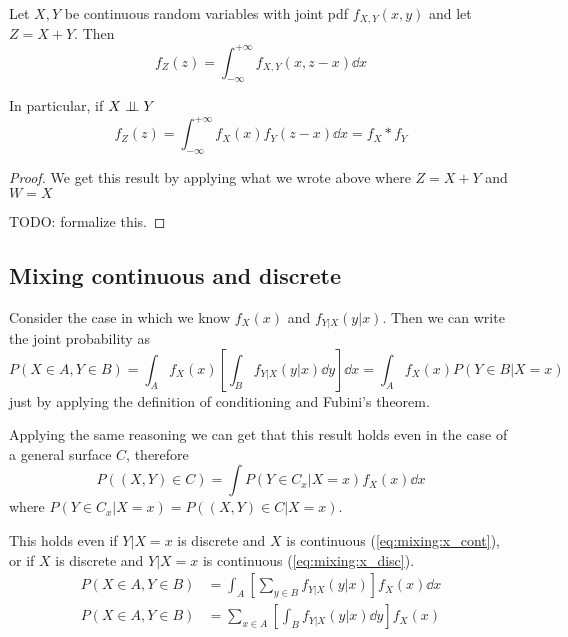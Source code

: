 \documentclass[12pt]{extarticle}
\begin{document}
\begin{theorem}
    Let $X, Y$ be continuous random variables with joint pdf $f_{X, Y}(x, y)$ and let $Z = X + Y$.
    Then
    \begin{equation}
        f_Z(z) = \int_{-\infty}^{+\infty} f_{X, Y} (x, z-x) \dd{x}
    \end{equation}

    In particular, if $X \perp \!\!\! \perp Y$
    \begin{equation}
        f_Z(z) = \int_{-\infty}^{+\infty} f_X(x) f_Y(z-x) \dd{x} = f_X \ast f_Y
    \end{equation}
\end{theorem}

\begin{proof}
    We get this result by applying what we wrote above where $Z = X + Y$ and $W = X$

    TODO: formalize this.
\end{proof}

\subsection{Mixing continuous and discrete}

Consider the case in which we know $f_X(x)$ and $f_{Y|X}(y|x)$.
Then we can write the joint probability as
\begin{equation}
    P(X\in A, Y \in B) = \int_A f_X(x) \left[\int_B f_{Y|X}(y|x) \dd{y} \right] \dd{x} = \int_A f_X(x) P(Y\in B| X = x)
\end{equation}
just by applying the definition of conditioning and Fubini's theorem.

Applying the same reasoning we can get that this result holds even in the case of a general surface $C$, therefore
\begin{equation}
    P((X, Y) \in C) = \int P(Y \in C_x | X = x) f_X(x) \dd{x}
\end{equation}
where $P(Y \in C_x | X = x) = P((X, Y) \in C | X = x)$.

This holds even if $Y|X = x$ is discrete and $X$ is continuous (\autoref{eq:mixing:x_cont}), or if $X$ is discrete and $Y|X = x$ is continuous (\autoref{eq:mixing:x_disc}).
\begin{align}
    P(X \in A, Y \in B) & = \int_A \left[\sum_{y \in B} f_{Y | X}(y| x)\right] f_X(x) \dd{x} \label{eq:mixing:x_cont} \\
    P(X \in A, Y \in B) & = \sum_{x \in A} \left[ \int_B f_{Y|X}(y|x) \dd{y} \right] f_X(x) \label{eq:mixing:x_disc}
\end{align}
\end{document}
